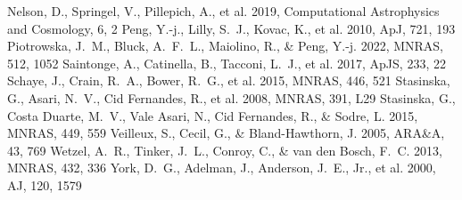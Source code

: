 \documentclass[twocolumn]{aastex631}
\begin{document}
\begin{thebibliography}{}
 Nelson, D., Springel, V., Pillepich, A., et al. 2019, Computational Astrophysics and Cosmology, 6, 2
 Peng, Y.-j., Lilly, S.~J., Kovac, K., et al. 2010, ApJ, 721, 193
 Piotrowska, J.~M., Bluck, A.~F.~L., Maiolino, R., \& Peng, Y.-j. 2022, MNRAS, 512, 1052
 Saintonge, A., Catinella, B., Tacconi, L.~J., et al. 2017, ApJS, 233, 22
 Schaye, J., Crain, R.~A., Bower, R.~G., et al. 2015, MNRAS, 446, 521
 Stasinska, G., Asari, N.~V., Cid Fernandes, R., et al. 2008, MNRAS, 391, L29
 Stasinska, G., Costa Duarte, M.~V., Vale Asari, N., Cid Fernandes, R., \& Sodre, L. 2015, MNRAS, 449, 559
 Veilleux, S., Cecil, G., \& Bland-Hawthorn, J. 2005, ARA\&A, 43, 769
 Wetzel, A.~R., Tinker, J.~L., Conroy, C., \& van den Bosch, F.~C. 2013, MNRAS, 432, 336
 York, D.~G., Adelman, J., Anderson, J.~E., Jr., et al. 2000, AJ, 120, 1579
\end{thebibliography}
\end{document}
